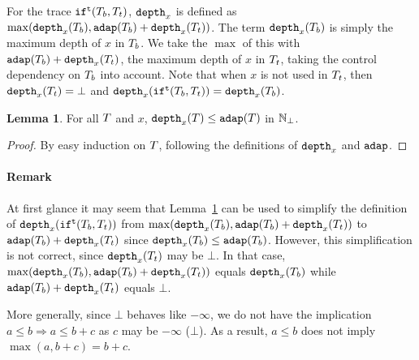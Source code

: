 \documentclass[a4paper,11pt]{article}
\theoremstyle{definition}
\newtheorem{lem}[thm]{Lemma}
\begin{document}
For the trace $\mathtt{if}^{\mathtt{t}}(T_b, T_t)$, $\mathtt{depth}_{x}$ is defined as
$\max(\mathtt{depth}_{x}(T_b), \mathtt{adap}(T_b) + \mathtt{depth}_{x}(T_t))$. The term
$\mathtt{depth}_{x}(T_b)$ is simply the maximum depth of $x$ in $T_b$. We
take the $\max$ of this with $\mathtt{adap}(T_b) + \mathtt{depth}_{x}(T_t)$, the
maximum depth of $x$ in $T_t$, taking the control dependency on
$T_b$ into account. Note that when $x$ is not used in $T_t$, then
$\mathtt{depth}_{x}(T_t) = \bot$ and $\mathtt{depth}_{x}(\mathtt{if}^{\mathtt{t}}(T_b, T_t)) =
\mathtt{depth}_{x}(T_b)$.

\begin{lem}\label{lem:ddep-leq-adap}
For all $T$ and $x$, $\mathtt{depth}_{x}(T) \leq \mathtt{adap}(T)$ in $\mathbb{N}_{\bot}$.
\end{lem}
%
\begin{proof}
By easy induction on $T$, following the definitions of $\mathtt{depth}_{x}$
and $\mathtt{adap}$.
\end{proof}



\paragraph{Remark}
At first glance it may seem that Lemma~\ref{lem:ddep-leq-adap} can be
used to simplify the definition of $\mathtt{depth}_{x}(\mathtt{if}^{\mathtt{t}}(T_b, T_t))$
from $\max(\mathtt{depth}_{x}(T_b), \mathtt{adap}(T_b) + \mathtt{depth}_{x}(T_t))$ to
$\mathtt{adap}(T_b) + \mathtt{depth}_{x}(T_t)$ since $\mathtt{depth}_{x}(T_b) \leq
\mathtt{adap}(T_b)$. However, this simplification is not correct, since
$\mathtt{depth}_{x}(T_t)$ may be $\bot$. In that case, $\max(\mathtt{depth}_{x}(T_b),
\mathtt{adap}(T_b) + \mathtt{depth}_{x}(T_t))$ equals $\mathtt{depth}_{x}(T_b)$ while
$\mathtt{adap}(T_b) + \mathtt{depth}_{x}(T_t)$ equals $\bot$.

More generally, since $\bot$ behaves like $-\infty$, we do not have
the implication $a \leq b \Rightarrow a \leq b + c$ as $c$ may be
$-\infty$ ($\bot$). As a result, $a \leq b$ does not imply $\max(a, b
+ c) = b + c$.
\end{document}
